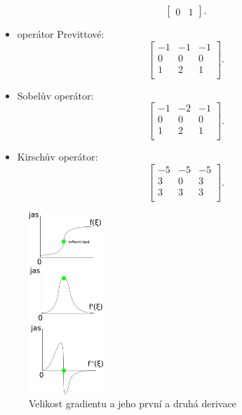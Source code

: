 \begin{itemize}
\begin{equation*}
\begin{bmatrix}
     0 & 1  
          \end{bmatrix}.
\end{equation*}
	\item operátor Previttové:
	\begin{equation*}
	 \begin{bmatrix}
     -1 & -1  & -1      \\[0.3em]
      0 &  0  &  0      \\[0.3em]
      1 &  2  &  1      \\
     \end{bmatrix}.
\end{equation*}
	\item Sobelův operátor:
	\begin{equation*}
	 \begin{bmatrix}
     -1 & -2  & -1      \\[0.3em]
      0 &  0  &  0      \\[0.3em]
      1 &  2  &  1      \\
     \end{bmatrix}.
\end{equation*}
	\item Kirschův operátor:
		\begin{equation*}
	 \begin{bmatrix}
     -5 & -5  & -5      \\[0.3em]
      3 &  0  &  3      \\[0.3em]
      3 &  3  &  3      \\
     \end{bmatrix}.
\end{equation*}
\end{itemize}
 		\begin{figure}[H]
 	\begin{center}
	\includegraphics[width=0.25\textwidth]{assets/8_det_hran_grad}
	\caption{Velikost gradientu a jeho první a druhá derivace}
	\end{center}
	\end{figure}
